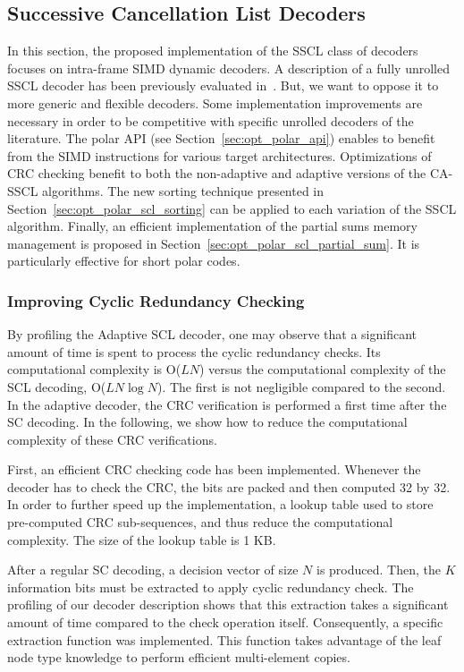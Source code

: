 \subsection{Successive Cancellation List Decoders}
\label{sec:opt_polar_scl}

In this section, the proposed implementation of the SSCL class of decoders
focuses on intra-frame SIMD dynamic decoders. A description of a fully unrolled
SSCL decoder has been previously evaluated in~\cite{Sarkis2016}. But, we want to
oppose it to more generic and flexible decoders. Some implementation
improvements are necessary in order to be competitive with specific unrolled
decoders of the literature. The polar API (see Section~\ref{sec:opt_polar_api})
enables to benefit from the SIMD instructions for various target architectures.
Optimizations of CRC checking benefit to both the non-adaptive and adaptive
versions of the CA-SSCL algorithms. The new sorting technique presented in
Section~\ref{sec:opt_polar_scl_sorting} can be applied to each variation of the
SSCL algorithm. Finally, an efficient implementation of the partial sums memory
management is proposed in Section~\ref{sec:opt_polar_scl_partial_sum}. It is
particularly effective for short polar codes.

\subsubsection{Improving Cyclic Redundancy Checking}
\label{sec:opt_polar_scl_crc}

By profiling the Adaptive SCL decoder, one may observe that a significant amount
of time is spent to process the cyclic redundancy checks. Its computational
complexity is O($LN$) versus the computational complexity of the SCL decoding,
O($LN\log N$). The first is not negligible compared to the second. In the
adaptive decoder, the CRC verification is performed a first time after the SC
decoding. In the following, we show how to reduce the computational complexity
of these CRC verifications.

\newpage
First, an efficient CRC checking code has been implemented. Whenever the decoder
has to check the CRC, the bits are packed and then computed 32 by 32. In order
to further speed up the implementation, a lookup table used to store
pre-computed CRC sub-sequences, and thus reduce the computational complexity.
The size of the lookup table is 1 KB.

After a regular SC decoding, a decision vector of size $N$ is produced. Then,
the $K$ information bits must be extracted to apply cyclic redundancy check. The
profiling of our decoder description shows that this extraction takes a
significant amount of time compared to the check operation itself. Consequently,
a specific extraction function was implemented. This function takes advantage of
the leaf node type knowledge to perform efficient multi-element copies.

